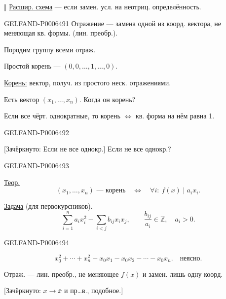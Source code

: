 \(\Vert\) \underline{Расшир. схема} --- если замен. усл. на неотриц. определённость.


\begin{GelfandAdjacentEvidence}{GELFAND-P000649}{1}
Отражение --- замена одной из коорд. вектора, не меняющая кв. формы. (лин. преобр.).

Породим группу всеми отраж.

Простой корень --- \((0,0,\ldots,1,\ldots,0)\).

\underline{Корень:} вектор, получ. из простого неск. отражениями.

Есть вектор \((x_1,\ldots,x_n)\). Когда он корень?

Если все чёрт. однократные, то корень \(\Longleftrightarrow\) кв. форма на нём равна 1.
\end{GelfandAdjacentEvidence}
\begin{GelfandAdjacentEvidence}{GELFAND-P000649}{2}


[Зачёркнуто: Если не все однокр.] Если не все однокр.?
\end{GelfandAdjacentEvidence}
\begin{GelfandAdjacentEvidence}{GELFAND-P000649}{3}


\underline{Теор.}
\[
(x_1,\ldots,x_n)\text{ --- корень}\quad\Longleftrightarrow\quad
\forall i:\ f(x)\mid a_i x_i.
\]

\underline{Задача} (для первокурсников).
\[
\sum_{i=1}^{n} a_i x_i^2-\sum_{i<j}b_{ij}x_ix_j,
\qquad \frac{b_{ij}}{a_i}\in\mathbb{Z},\quad a_i>0.
\]

\end{GelfandAdjacentEvidence}
\begin{GelfandAdjacentEvidence}{GELFAND-P000649}{4}

\[
x_0^2+\cdots+x_n^2-x_0x_1-x_0x_2-\cdots-x_0x_n.
\quad \text{неясно.}
\]

Отраж. --- лин. преобр., не меняющее \(f(x)\) и замен. лишь одну коорд.

[Зачёркнуто: \(x\to\bar x\) и пр\ldots в., подобное.]
\end{GelfandAdjacentEvidence}

